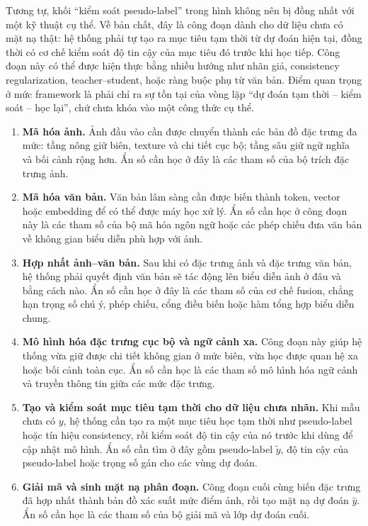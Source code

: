 Tương tự, khối ``kiểm soát pseudo-label'' trong hình không nên bị đồng nhất với một kỹ thuật cụ thể. Về bản chất, đây là công đoạn dành cho dữ liệu chưa có mặt nạ thật: hệ thống phải tự tạo ra mục tiêu tạm thời từ dự đoán hiện tại, đồng thời có cơ chế kiểm soát độ tin cậy của mục tiêu đó trước khi học tiếp. Công đoạn này có thể được hiện thực bằng nhiều hướng như nhãn giả, consistency regularization, teacher--student, hoặc ràng buộc phụ từ văn bản. Điểm quan trọng ở mức framework là phải chỉ ra sự tồn tại của vòng lặp ``dự đoán tạm thời -- kiểm soát -- học lại'', chứ chưa khóa vào một công thức cụ thể.

\begin{enumerate}
  \item \textbf{Mã hóa ảnh.} Ảnh đầu vào cần được chuyển thành các bản đồ đặc trưng đa mức: tầng nông giữ biên, texture và chi tiết cục bộ; tầng sâu giữ ngữ nghĩa và bối cảnh rộng hơn. Ẩn số cần học ở đây là các tham số của bộ trích đặc trưng ảnh.

  \item \textbf{Mã hóa văn bản.} Văn bản lâm sàng cần được biến thành token, vector hoặc embedding để có thể được máy học xử lý. Ẩn số cần học ở công đoạn này là các tham số của bộ mã hóa ngôn ngữ hoặc các phép chiếu đưa văn bản về không gian biểu diễn phù hợp với ảnh.

  \item \textbf{Hợp nhất ảnh--văn bản.} Sau khi có đặc trưng ảnh và đặc trưng văn bản, hệ thống phải quyết định văn bản sẽ tác động lên biểu diễn ảnh ở đâu và bằng cách nào. Ẩn số cần học ở đây là các tham số của cơ chế fusion, chẳng hạn trọng số chú ý, phép chiếu, cổng điều biến hoặc hàm tổng hợp biểu diễn chung.

  \item \textbf{Mô hình hóa đặc trưng cục bộ và ngữ cảnh xa.} Công đoạn này giúp hệ thống vừa giữ được chi tiết không gian ở mức biên, vừa học được quan hệ xa hoặc bối cảnh toàn cục. Ẩn số cần học là các tham số mô hình hóa ngữ cảnh và truyền thông tin giữa các mức đặc trưng.

  \item \textbf{Tạo và kiểm soát mục tiêu tạm thời cho dữ liệu chưa nhãn.} Khi mẫu chưa có \(y\), hệ thống cần tạo ra một mục tiêu học tạm thời như pseudo-label hoặc tín hiệu consistency, rồi kiểm soát độ tin cậy của nó trước khi dùng để cập nhật mô hình. Ẩn số cần tìm ở đây gồm pseudo-label \(\tilde{y}\), độ tin cậy của pseudo-label hoặc trọng số gán cho các vùng dự đoán.

  \item \textbf{Giải mã và sinh mặt nạ phân đoạn.} Công đoạn cuối cùng biến đặc trưng đã hợp nhất thành bản đồ xác suất mức điểm ảnh, rồi tạo mặt nạ dự đoán \(\hat{y}\). Ẩn số cần học là các tham số của bộ giải mã và lớp dự đoán cuối.
\end{enumerate}

